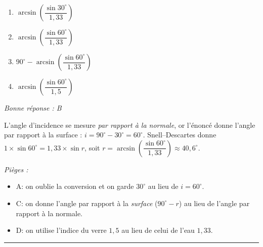 \documentclass[11pt,a4paper]{article}
\begin{document}
\begin{center}
\end{center}

\begin{enumerate}[label=\Alph*)]
\item $\arcsin\!\left(\dfrac{\sin 30^\circ}{1{,}33}\right)$
\item $\arcsin\!\left(\dfrac{\sin 60^\circ}{1{,}33}\right)$
\item $90^\circ-\arcsin\!\left(\dfrac{\sin 60^\circ}{1{,}33}\right)$
\item $\arcsin\!\left(\dfrac{\sin 60^\circ}{1{,}5}\right)$
\end{enumerate}
\textit{Bonne réponse : B}\par
L'angle d'incidence se mesure \emph{par rapport à la normale}, or l'énoncé donne l'angle par rapport à la surface : $i = 90^\circ - 30^\circ = 60^\circ$. Snell--Descartes donne $1\times\sin 60^\circ = 1{,}33\times\sin r$, soit $r=\arcsin\!\left(\dfrac{\sin 60^\circ}{1{,}33}\right)\approx 40{,}6^\circ$.\par
\textit{Pièges :}
\begin{itemize}
\item A: on oublie la conversion et on garde $30^\circ$ au lieu de $i=60^\circ$.
\item C: on donne l'angle par rapport à la \emph{surface} ($90^\circ-r$) au lieu de l'angle par rapport à la normale.
\item D: on utilise l'indice du verre $1{,}5$ au lieu de celui de l'eau $1{,}33$.
\end{itemize}
\vspace{8pt}\hrule\vspace{8pt}
\end{document}
